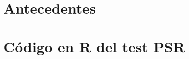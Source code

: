 \documentclass[12pt,a4paper]{mitthesis}
\begin{document}

\chapter{Antecedentes}




















%


\appendix

\chapter{C\'odigo en R del test PSR}




{}
%


\end{document}

